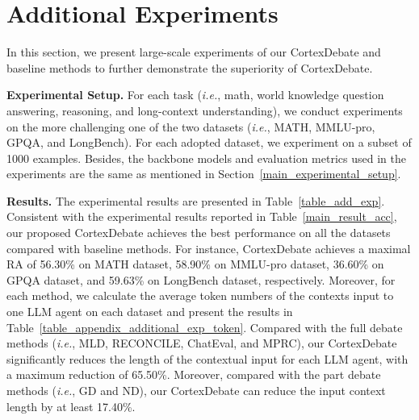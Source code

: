 \section{Additional Experiments}
\label{appendix_additional_experiments}

In this section, we present large-scale experiments of our CortexDebate and baseline methods to further demonstrate the superiority of CortexDebate. 

\textbf{Experimental Setup.} For each task (\textit{i.e.}, math, world knowledge question answering, reasoning, and long-context understanding), we conduct experiments on the more challenging one of the two datasets (\textit{i.e.}, MATH, MMLU-pro, GPQA, and LongBench). For each adopted dataset, we experiment on a subset of 1000 examples. Besides, the backbone models and evaluation metrics used in the experiments are the same as mentioned in Section~\ref{main_experimental_setup}.

\textbf{Results.} The experimental results are presented in Table~\ref{table_add_exp}. Consistent with the experimental results reported in Table~\ref{main_result_acc}, our proposed CortexDebate achieves the best performance on all the datasets compared with baseline methods. For instance, CortexDebate achieves a maximal RA of 56.30\% on MATH dataset, 58.90\% on MMLU-pro dataset, 36.60\% on GPQA dataset, and 59.63\% on LongBench dataset, respectively. Moreover, for each method, we calculate the average token numbers of the contexts input to one LLM agent on each dataset and present the results in Table~\ref{table_appendix_additional_exp_token}. Compared with the full debate methods (\textit{i.e.}, MLD, RECONCILE, ChatEval, and MPRC), our CortexDebate significantly reduces the length of the contextual input for each LLM agent, with a maximum reduction of 65.50\%. Moreover, compared with the part debate methods (\textit{i.e.}, GD and ND), our CortexDebate can reduce the input context length by at least 17.40\%.